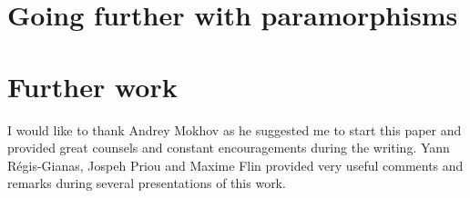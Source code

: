 \documentclass[format=sigplan, review=true, anonymous=true]{acmart}
\begin{document}
\section{Going further with paramorphisms}
\label{sec:para}


\section{Further work}
\label{sec:related}


\begin{acks}
I would like to thank Andrey Mokhov as he suggested me to start this paper and provided great counsels and constant encouragements during the writing. Yann Régis-Gianas, Jospeh Priou and Maxime Flin provided very useful comments and remarks during several presentations of this work.
\end{acks}



\end{document}
